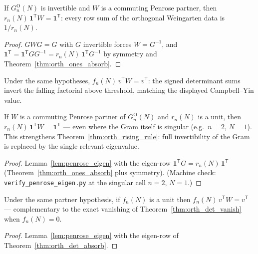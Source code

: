 \begin{theorem}\label{thm:orth_rising_rule}
\leanok
{}
If $G^{\mathrm O}_n(N)$ is invertible and $W$ is a commuting Penrose
partner, then $r_n(N)\,\mathbf 1^{\mathsf T}W = \mathbf 1^{\mathsf T}$:
every row sum of the orthogonal Weingarten data is $1/r_n(N)$.
\end{theorem}

\begin{proof}
\leanok
$GWG=G$ with $G$ invertible forces $W=G^{-1}$, and
$\mathbf 1^{\mathsf T} = \mathbf 1^{\mathsf T}GG^{-1}
= r_n(N)\,\mathbf 1^{\mathsf T}G^{-1}$ by symmetry and
Theorem~\ref{thm:orth_ones_absorb}.
\end{proof}

\begin{theorem}\label{thm:orth_falling_rule}
\leanok
{}
Under the same hypotheses,
$f_n(N)\,v^{\mathsf T}W = v^{\mathsf T}$: the signed determinant sums
invert the falling factorial above threshold, matching the displayed
Campbell--Yin value.
\end{theorem}

\begin{theorem}\label{thm:orth_rising_rule_eigen}
\leanok
{}
If $W$ is a commuting Penrose partner of $G^{\mathrm O}_n(N)$ and
$r_n(N)$ is a unit, then
$r_n(N)\,\mathbf 1^{\mathsf T}W = \mathbf 1^{\mathsf T}$ --- even where
the Gram itself is singular (e.g.\ $n=2$, $N=1$). This strengthens
Theorem~\ref{thm:orth_rising_rule}: full invertibility of the Gram is
replaced by the single relevant eigenvalue.
\end{theorem}
\begin{proof}
\leanok
{}
Lemma~\ref{lem:penrose_eigen} with the eigen-row
$\mathbf 1^{\mathsf T}G = r_n(N)\,\mathbf 1^{\mathsf T}$
(Theorem~\ref{thm:orth_ones_absorb} plus symmetry). (Machine check:
\texttt{verify\_penrose\_eigen.py} at the singular cell $n=2$, $N=1$.)
\end{proof}

\begin{theorem}\label{thm:orth_falling_rule_eigen}
\leanok
{}
Under the same partner hypothesis, if $f_n(N)$ is a unit then
$f_n(N)\,v^{\mathsf T}W = v^{\mathsf T}$ --- complementary to the exact
vanishing of Theorem~\ref{thm:orth_det_vanish} when $f_n(N)=0$.
\end{theorem}
\begin{proof}
\leanok
{}
Lemma~\ref{lem:penrose_eigen} with the eigen-row of
Theorem~\ref{thm:orth_det_absorb}.
\end{proof}

